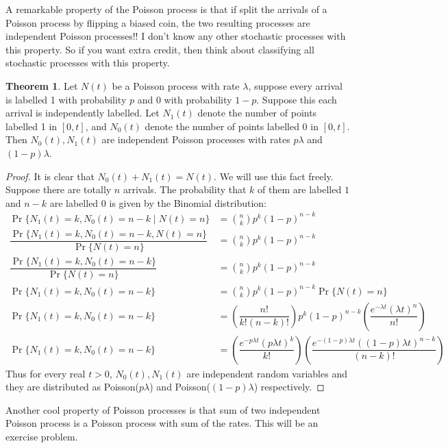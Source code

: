 \documentclass[letterpaper, 12pt]{article}
\newcommand{\1}{\mathds{1}} %
\theoremstyle{definition}
\newtheorem{theorem}{Theorem}[section]
\begin{document}
A remarkable property of the Poisson process is that if split the arrivals of a Poisson process by flipping a biased coin, the two resulting processes are independent Poisson processes!! I don't know any other stochastic processes with this property. So if you want extra credit, then think about classifying all stochastic processes with this property. 
\begin{theorem}
\label{thm:splittingPoisson}
Let $N(t)$ be a Poisson process with rate $\lambda$, suppose every arrival is labelled 1 with probability $p$ and $0$ with probability $1-p$. Suppose this each arrival is independently labelled. Let $N_1(t)$ denote the number of points labelled 1 in $[0,t]$, and $N_0(t)$ denote the number of points labelled 0 in $[0,t]$. Then $N_0(t),N_1(t)$ are independent Poisson processes with rates $p\lambda$ and $(1-p)\lambda$.
\end{theorem}
\begin{proof}
It is clear that $N_0(t)+N_1(t)=N(t)$. We will use this fact freely.\\ 
Suppose there are totally $n$ arrivals. The probability that $k$ of them are labelled $1$ and $n-k$ are labelled $0$ is given by the Binomial distribution:
\begin{align*}
\Pr\{N_1(t)=k,N_0(t)=n-k \mid N(t)=n\} &= \binom{n}{k} p^k (1-p)^{n-k}\\
\dfrac{\Pr\{N_1(t)=k,N_0(t)=n-k,N(t)=n\}}{\Pr\{N(t)=n\}} &= \binom{n}{k} p^k (1-p)^{n-k}\\
\dfrac{\Pr\{N_1(t)=k,N_0(t)=n-k\}}{\Pr\{N(t)=n\}} &= \binom{n}{k} p^k (1-p)^{n-k}\\
\Pr\{N_1(t)=k,N_0(t)=n-k\} &= \binom{n}{k} p^k (1-p)^{n-k}\Pr\{N(t)=n\}\\
\Pr\{N_1(t)=k,N_0(t)=n-k\} &= \left(\dfrac{n!}{k!(n-k)!}\right) p^k (1-p)^{n-k}\left(\dfrac{e^{-\lambda t}(\lambda t)^n}{n!}\right)\\
\Pr\{N_1(t)=k,N_0(t)=n-k\} &= \left(\dfrac{e^{-p\lambda t}(p\lambda t)^k}{k!}\right)\left(\dfrac{e^{-(1-p)\lambda t}((1-p)\lambda t)^{n-k}}{(n-k)!}\right)
\end{align*}
Thus for every real $t>0$, $N_0(t),N_1(t)$ are independent random variables and they are distributed as Poisson($p\lambda$) and Poisson($(1-p)\lambda$) respectively.
\end{proof}

Another cool property of Poisson processes is that sum of two independent Poisson process is a Poisson process with sum of the rates. This will be an exercise problem. 
\end{document}
